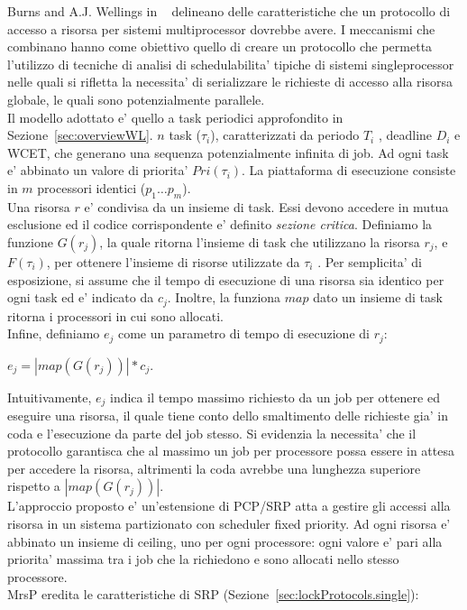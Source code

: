 Burns and A.J. Wellings in ~\cite{Burns:2013:SCM:2547348.2547350} delineano delle caratteristiche che un protocollo di accesso a risorsa per sistemi multiprocessor dovrebbe avere. I meccanismi che combinano hanno come obiettivo quello di creare un protocollo che permetta l’utilizzo di tecniche di analisi di schedulabilita’ tipiche di sistemi singleprocessor nelle quali si rifletta la necessita’ di serializzare le richieste di accesso alla risorsa globale, le quali sono potenzialmente parallele.\\

Il modello adottato e’ quello a task periodici approfondito in Sezione~\ref{sec:overviewWL}. $n$ task ($\tau_i$), caratterizzati da periodo $T_i$ , deadline $D_i$ e WCET, che generano una sequenza potenzialmente infinita di job. Ad ogni task e’ abbinato un valore di priorita’ $Pri(\tau_i)$. La piattaforma di esecuzione consiste in $m$ processori identici ($p_1 … p_m$).\\
Una risorsa $r$ e’ condivisa da un insieme di task. Essi devono accedere in mutua esclusione ed il codice corrispondente e’ definito \textit{sezione critica}. Definiamo la funzione $G(r_j)$, la quale ritorna l’insieme di task che utilizzano la risorsa $r_j$, e $F(\tau_i)$, per ottenere l’insieme di risorse utilizzate da $\tau_i$ . Per semplicita’ di esposizione, si assume che il tempo di esecuzione di una risorsa sia identico per ogni task ed e’ indicato da $c_j$. Inoltre, la funziona $map$ dato un insieme di task ritorna i processori in cui sono allocati.\\
Infine, definiamo $e_j$ come un parametro di tempo di esecuzione di $r_j$:\\

\centerline{$e_j = | map(G(r_j)) | * c_j$.}

Intuitivamente, $e_j$ indica il tempo massimo richiesto da un job per ottenere ed eseguire una risorsa, il quale tiene conto dello smaltimento delle richieste gia’ in coda e l’esecuzione da parte del job stesso. Si evidenzia la necessita' che il protocollo garantisca che al massimo un job per processore possa essere in attesa per accedere la risorsa, altrimenti la coda avrebbe una lunghezza superiore rispetto a $| map(G(r_j)) |$.\\

L’approccio proposto e’ un’estensione di PCP/SRP atta a gestire gli accessi alla risorsa in un sistema partizionato con scheduler fixed priority. Ad ogni risorsa e' abbinato un insieme di ceiling, uno per ogni processore: ogni valore e' pari alla priorita' massima tra i job che la richiedono e sono allocati nello stesso processore.\\
MrsP eredita le caratteristiche di SRP (Sezione~\ref{sec:lockProtocols.single}):

